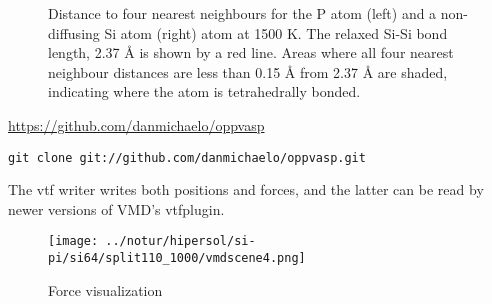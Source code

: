 \documentclass[11pt,bibliography=totoc,index=totoc]{scrbook}   %
\begin{document}
\begin{figure}[htbp]
  \centering
  \caption{Distance to four nearest neighbours for the P atom (left) and a non-diffusing 
      Si atom (right) atom at 1500 K. 
      The relaxed Si-Si bond length, 2.37 Å is shown by a red line. 
      Areas where all four nearest neighbour distances are less than 0.15 Å 
  from 2.37 Å are shaded, indicating where the atom is tetrahedrally bonded.}
  \label{fig:nneighboursex}
\end{figure}



\url{https://github.com/danmichaelo/oppvasp}
\begin{lstlisting}
git clone git://github.com/danmichaelo/oppvasp.git
\end{lstlisting}

The vtf writer writes both positions and forces, and the latter can be read by newer versions of VMD's vtfplugin.

\begin{figure}[htbp]
  \centering
  \texttt{[image: ../notur/hipersol/si-pi/si64/split110\_1000/vmdscene4.png]}
  \caption{Force visualization}
  \label{fig:forceviz}
\end{figure}



\end{document}
